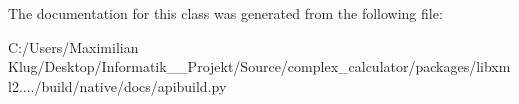 The documentation for this class was generated from the following file\+:\begin{DoxyCompactItemize}
\item 
C\+:/\+Users/\+Maximilian Klug/\+Desktop/\+Informatik\+\_\+\_\+\+Projekt/\+Source/complex\+\_\+calculator/packages/libxml2..../build/native/docs/apibuild.\+py\end{DoxyCompactItemize}
